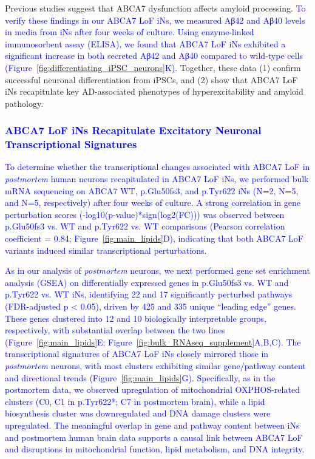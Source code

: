 Previous studies suggest that ABCA7 dysfunction affects amyloid processing\cite{Satoh2015-yu,Sakae2016-uy,Bamji-Mirza2018-xt,Chan2008-qu,De_Roeck2018-zx}. \textcolor{blue}{To verify these findings in our ABCA7 LoF iNs, we measured Aβ42 and Aβ40 levels in media from iNs after four weeks of culture. Using enzyme-linked immunosorbent assay (ELISA), we found that ABCA7 LoF iNs exhibited a significant increase in both secreted Aβ42 and Aβ40 compared to wild-type cells (Figure~\ref{fig:differentiating_iPSC_neurons}K).} Together, these data (1) confirm successful neuronal differentiation from iPSCs, and (2) show that ABCA7 LoF iNs recapitulate key AD-associated phenotypes of hyperexcitability and amyloid pathology.

\subsubsection{\textcolor{blue}{ABCA7 LoF iNs Recapitulate Excitatory Neuronal Transcriptional Signatures}}
\textcolor{blue}{To determine whether the transcriptional changes associated with ABCA7 LoF in \emph{postmortem} human neurons recapitulated in ABCA7 LoF iNs, we performed bulk mRNA sequencing on ABCA7 WT, p.Glu50fs3, and p.Tyr622 iNs (N=2, N=5, and N=5, respectively) after four weeks of culture. A strong correlation in gene perturbation scores (-log10(p-value)*sign(log2(FC))) was observed between p.Glu50fs3 vs. WT and p.Tyr622 vs. WT comparisons (Pearson correlation coefficient = 0.84; Figure~\ref{fig:main_lipids}D), indicating that both ABCA7 LoF variants induced similar transcriptional perturbations.}

\textcolor{blue}{As in our analysis of \emph{postmortem} neurons, we next performed gene set enrichment analysis (GSEA) on differentially expressed genes in p.Glu50fs3 vs. WT and p.Tyr622 vs. WT iNs, identifying 22 and 17 significantly perturbed pathways (FDR-adjusted p < 0.05), driven by 425 and 335 unique “leading edge” genes\cite{Subramanian2005-pu}. These genes clustered into 12 and 10 biologically interpretable groups, respectively, with substantial overlap between the two lines (Figure~\ref{fig:main_lipids}E; Figure~\ref{fig:bulk_RNAseq_supplement}A,B,C). The transcriptional signatures of ABCA7 LoF iNs closely mirrored those in \emph{postmortem} neurons, with most clusters exhibiting similar gene/pathway content and directional trends (Figure~\ref{fig:main_lipids}G). Specifically, as in the postmortem data, we observed upregulation of mitochondrial OXPHOS-related clusters (C0, C1 in p.Tyr622*; C7 in postmortem brain), while a lipid biosynthesis cluster was downregulated and DNA damage clusters were upregulated. The meaningful overlap in gene and pathway content between iNs and postmortem human brain data supports a causal link between ABCA7 LoF and disruptions in mitochondrial function, lipid metabolism, and DNA integrity.}

